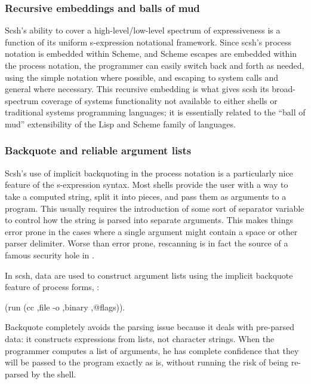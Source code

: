 \subsubsection*{Recursive embeddings and balls of mud}
Scsh's ability to cover a high-level/low-level spectrum of expressiveness
is a function of its uniform s-expression notational framework.
Since scsh's process notation is embedded within Scheme,
and Scheme escapes are embedded within the process notation,
the programmer can easily switch back and forth as needed,
using the simple notation where possible, 
and escaping to system calls and general {\Scheme} where necessary.
This recursive embedding is what gives scsh its broad-spectrum coverage
of systems functionality not available to either shells or traditional
systems programming languages;
it is essentially related to the ``ball of mud'' extensibility of the 
Lisp and Scheme family of languages.

\subsubsection*{Backquote and reliable argument lists}
Scsh's use of implicit backquoting in the process notation is a particularly
nice feature of the s-expression syntax.
Most {\Unix} shells provide the user with a way to take a computed string,
split it into pieces, and pass them as arguments to a program.
This usually requires the introduction of some sort of  separator
variable to control how the string is parsed into separate arguments.
This makes things error prone in the cases where a single argument
might contain a space or other parser delimiter.
Worse than error prone,  rescanning is in fact the source of a
famous security hole in {\Unix} \cite{Reeds}.

In scsh, data are used to construct argument lists using the implicit backquote
feature of process forms, \eg:
\begin{tightcode}
(run (cc ,file -o ,binary ,@flags)).\end{tightcode}
Backquote completely avoids the parsing issue because it deals
with pre-parsed data: it constructs expressions from lists, not character
strings.
When the programmer computes a list of arguments, he has complete
confidence that they will be passed to the program exactly as is,
without running the risk of being re-parsed by the shell.

